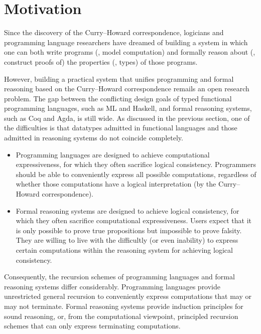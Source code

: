 \section{Motivation}\label{sec:intro:motiv}
Since the discovery of the Curry--Howard correspondence, logicians and
programming language researchers have dreamed of building a system in which
one can both write programs (\ie, model computation) and formally reason about
(\ie, construct proofs of) the properties (\ie, types) of those programs.

However, building a practical system that unifies programming and
formal reasoning based on the Curry--Howard correspondence remails
an open research problem. The gap between the conflicting design goals of
typed functional programming languages, such as ML and Haskell, and
formal reasoning systems, such as Coq and Agda, is still wide.
As discussed in the previous section, one of the difficulties is
that datatypes admitted in functional languages and those admitted
in reasoning systems do not coincide completely.

\begin{itemize}

\item
Programming languages are designed to achieve computational expressiveness,
for which they often sacrifice logical consistency.
Programmers should be able to conveniently express all possible computations,
regardless of whether those computations have a logical interpretation
(by the Curry--Howard correspondence).

\item
Formal reasoning systems are designed to achieve logical consistency,
for which they often sacrifice computational expressiveness.
Users expect that it is only possible to prove true propositions
but impossible to prove falsity. They are willing to live with
the difficultly (or even inability) to express certain computations
within the reasoning system for achieving logical consistency.

\end{itemize}

Consequently, the recursion schemes of programming languages and
formal reasoning systems differ considerably.
Programming languages provide unrestricted general recursion
to conveniently express computations that may or may not terminate.
Formal reasoning systems provide induction principles for sound reasoning,
or, from the computational viewpoint, principled recursion schemes that can only
express terminating computations.

